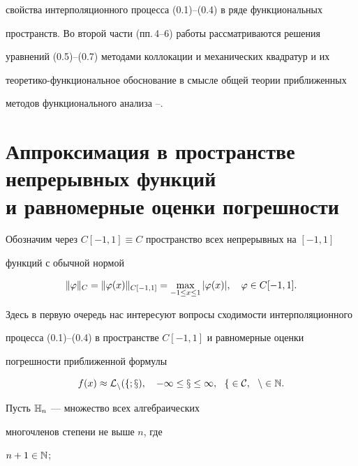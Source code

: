 свойства интерполяционного процесса (0.1)--(0.4) в ряде функциональных 


пространств. Во второй части (пп.\,4--6) работы рассматриваются решения 


уравнений (0.5)--(0.7) методами коллокации и механических квадратур и их 


теоретико-функциональное обоснование в смысле общей теории приближенных 


методов функционального анализа \cite{2}--\cite{11}.








\section{Аппроксимация в пространстве непрерывных функций\protect\\


и равномерные оценки погрешности}





Обозначим через $C[-1,1]\equiv C$ пространство всех непрерывных на $[-1,1]$


функций с обычной нормой


$$


\|\vp\|_C=\|\vp(x)\|_{C[-1,1]}=\max_{-1\le x\le 1}|\vp(x)|,


\quad \vp \in C[-1,1].


$$





Здесь в первую очередь нас интересуют вопросы сходимости интерполяционного


процесса (0.1)--(0.4) в пространстве $C[-1,1]$ и равномерные оценки 


погрешности приближенной формулы


\begin{equation}


f(x) \approx \cal{L}_n(f;x),\quad -1\le x\le 1,\ \ f\in C,\ \ n\in \N.


\end{equation}





Пусть $\Bbb{H}_n$ --- множество всех алгебраических 


многочленов степени не выше $n$, где


$n+1\in \Bbb{N}$;


$$


